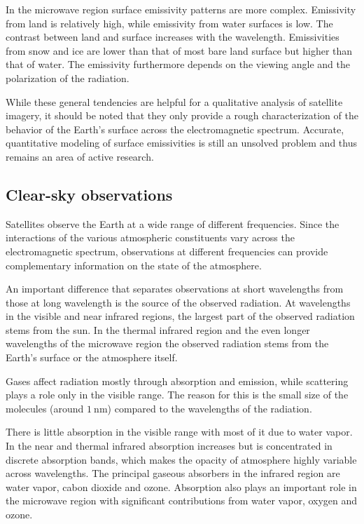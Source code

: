 In the microwave region surface emissivity patterns are more complex. Emissivity
from land is relatively high, while emissivity from water surfaces is low. The
contrast between land and surface increases with the wavelength. Emissivities
from snow and ice are lower than that of most bare land surface but higher than
that of water. The emissivity furthermore depends on the viewing angle and the
polarization of the radiation.

While these general tendencies are helpful for a qualitative analysis of
satellite imagery, it should be noted that they only provide a rough
characterization of the behavior of the Earth's surface across the
electromagnetic spectrum. Accurate, quantitative modeling of surface
emissivities is still an unsolved problem and thus remains an area of
active research.


\subsection{Clear-sky observations}

Satellites observe the Earth at a wide range of different frequencies. Since the
interactions of the various atmospheric constituents vary across the
electromagnetic spectrum, observations at different frequencies can provide
complementary information on the state of the atmosphere.

An important difference that separates observations at short wavelengths from
those at long wavelength is the source of the observed radiation. At wavelengths
in the visible and near infrared regions, the largest part of the observed
radiation stems from the sun. In the thermal infrared region and the even longer
wavelengths of the microwave region the observed radiation stems from the Earth's
surface or the atmosphere itself.

Gases affect radiation mostly through absorption and emission, while
scattering plays a role only in the visible range. The reason for this is
the small size of the molecules (around $\SI{1}{\nano \meter}$) compared
to the wavelengths of the radiation.

There is little absorption in the visible range with most of it due to water
vapor. In the near and thermal infrared absorption increases but is concentrated
in discrete absorption bands, which makes the opacity of atmosphere highly
variable across wavelengths. The principal gaseous absorbers in the infrared
region are water vapor, cabon dioxide and ozone. Absorption also plays an
important role in the microwave region with significant contributions from water
vapor, oxygen and ozone. 

